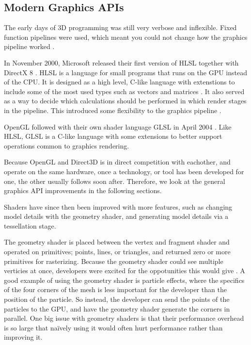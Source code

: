 \subsection{Modern Graphics \acs{API}s}

The early days of 3D programming was still very verbose and inflexible. 
Fixed function pipelines were used, which meant you could not change how the graphics pipeline worked \cite{davidovic2014fixedfunction}.

In November 2000, Microsoft released their first version of \gls{HLSL} together with DirectX 8 \cite{wikipedia????directx}.
\Gls{HLSL} is a language for small programs that runs on the \gls{GPU} instead of the \gls{CPU}.
It is designed as a high level, C-like language with extenstions to include some of the most used types such as vectors and matrices \cite{microsoft????hlsl}.
It also served as a way to decide which calculations should be performed in which render stages in the pipeline.
This introduced some flexibility to the graphics pipeline .

OpenGL followed with their own shader language \gls{GLSL} in April 2004 \cite{wikipedia????opengl}. 
Like \gls{HLSL}, \gls{GLSL} is a C-like language with some extensions to better support operations common to graphics rendering.

\vspace{1em}

\noindent
Because OpenGL and Direct3D is in direct competition with eachother, and operate on the same hardware, once a technology, or tool has been developed for one, the other usually follows soon after.
Therefore, we look at the general graphics \gls{API} improvements in the following sections.

\vspace{1em}

\noindent
Shaders have since then been improved with more features, such as changing model details with the geometry shader, and generating model details via a tessellation stage.

The geometry shader is placed between the vertex and fragment shader and operated on primitives; points, lines, or triangles, and returned zero or more primitives for rasterizing.
Because the geometry shader could see multiple verticies at once, developers were excited for the oppotunities this would give \cite{kronos????geometry, microsoft????geometry}.
A good example of using the geometry shader is particle effects, where the specifics of the four corners of the mesh is less important for the developer than the position of the particle.
So instead, the developer can send the points of the particles to the \gls{GPU}, and have the geometry shader generate the corners in parallel.
One big issue with geometry shaders is that their performance overhead is so large that naïvely using it would often hurt performance rather than improving it.

